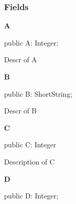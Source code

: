 \documentclass{report}
\newif\ifpdf
\begin{document}
\subsubsection*{\large{\textbf{Fields}}\normalsize\hspace{1ex}\hfill}
\begin{list}{}{
\setlength{\itemindent}{0cm}
\setlength{\listparindent}{0cm}
\setlength{\leftmargin}{\evensidemargin}
\addtolength{\leftmargin}{\tmplength}
\settowidth{\labelsep}{X}
\addtolength{\leftmargin}{\labelsep}
\setlength{\labelwidth}{\tmplength}
}
\label{ok_record_case_parsing.TRec3-A}
\item[\textbf{A}\hfill]
\ifpdf
\begin{flushleft}
\fi
\begin{ttfamily}
public A: Integer;\end{ttfamily}

\ifpdf
\end{flushleft}
\fi


\par Descr of A\label{ok_record_case_parsing.TRec3-B}
\item[\textbf{B}\hfill]
\ifpdf
\begin{flushleft}
\fi
\begin{ttfamily}
public B: ShortString;\end{ttfamily}

\ifpdf
\end{flushleft}
\fi


\par Descr of B\label{ok_record_case_parsing.TRec3-C}
\item[\textbf{C}\hfill]
\ifpdf
\begin{flushleft}
\fi
\begin{ttfamily}
public C: Integer\end{ttfamily}

\ifpdf
\end{flushleft}
\fi


\par Description of C\label{ok_record_case_parsing.TRec3-D}
\item[\textbf{D}\hfill]
\ifpdf
\begin{flushleft}
\fi
\begin{ttfamily}
public D: Integer;\end{ttfamily}

\ifpdf
\end{flushleft}
\fi



\end{list}
\end{document}
